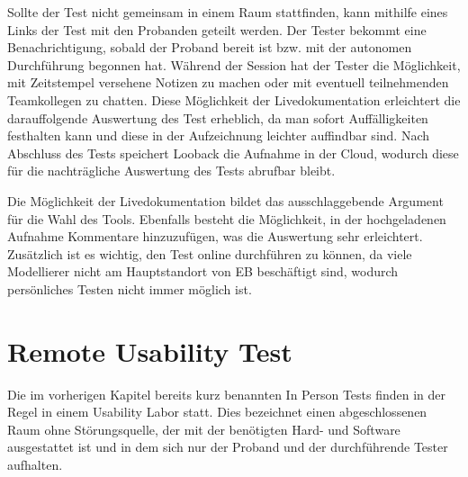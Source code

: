 Sollte der Test nicht gemeinsam in einem Raum stattfinden, kann mithilfe eines Links der Test mit den Probanden geteilt werden.
Der Tester bekommt eine Benachrichtigung, sobald der Proband bereit ist bzw. mit der autonomen Durchführung begonnen hat.
Während der Session hat der Tester die Möglichkeit, mit Zeitstempel versehene Notizen zu machen oder mit eventuell teilnehmenden Teamkollegen zu chatten.
Diese Möglichkeit der Livedokumentation erleichtert die darauffolgende Auswertung des Test erheblich, da man sofort Auffälligkeiten festhalten kann und diese in der Aufzeichnung leichter auffindbar sind.
Nach Abschluss des Tests speichert Looback die Aufnahme in der Cloud, wodurch diese für die nachträgliche Auswertung des Tests abrufbar bleibt. \cite{.10.01.2020}

Die Möglichkeit der Livedokumentation bildet das ausschlaggebende Argument für die Wahl des Tools.
Ebenfalls besteht die Möglichkeit, in der hochgeladenen Aufnahme Kommentare hinzuzufügen, was die Auswertung sehr erleichtert.
Zusätzlich ist es wichtig, den Test online durchführen zu können, da viele Modellierer nicht am Hauptstandort von EB beschäftigt sind, wodurch persönliches Testen nicht immer möglich ist.

\section{Remote Usability Test}
Die im vorherigen Kapitel bereits kurz benannten \glqq In Person\grqq{} Tests finden in der Regel in einem Usability Labor statt.
Dies bezeichnet einen abgeschlossenen Raum ohne Störungsquelle, der mit der benötigten Hard- und Software ausgestattet ist und in dem sich nur der Proband und der durchführende Tester aufhalten.

